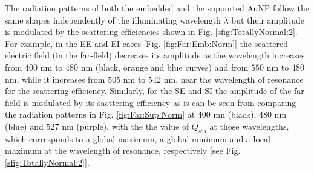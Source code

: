 The radiation patterns of both the embedded  and the supported AuNP follow the same shapes independently of the illuminating wavelength $\lambda$ but their amplitude is modulated by the scattering efficiencies shown in Fig. \ref{sfig:TotallyNormal:2}. For example, in the EE  and EI cases [Fig. \ref{fig:Far:Emb:Norm}] the scattered electric field (in the far-field) decreases its amplitude as the wavelength increases from $400$ nm to $480$ nm (black, orange and blue curves) and from   $550$ nm to $480$  nm, while it increases from $505$ nm to $542$ nm, near the wavelength of resonance for the scattering efficiency. Similarly, for the SE and SI  the amplitude of the far-field is modulated by its sacttering efficiency as is can be seen from comparing the radiation patterns in Fig. \ref{fig:Far:Sup:Norm} at $400$ mn (black), $480$ nm (blue) and  $527$ nm (purple), with the the value of $Q_\text{sca}$ at those wavelengths, which corresponds to a global maximum, a global minimum and a local maximum at the wavelength of resonance, respectively [see Fig. \ref{sfig:TotallyNormal:2}].

